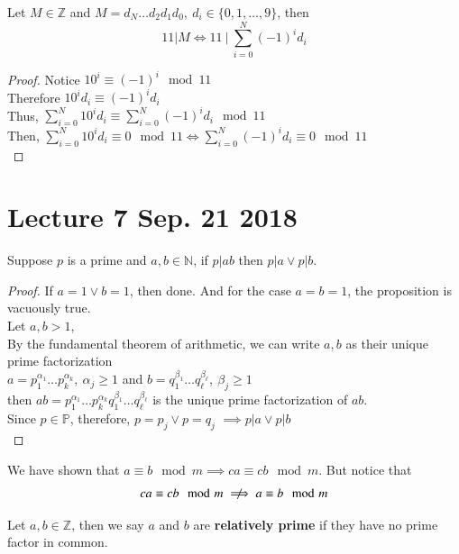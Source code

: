 \documentclass[10pt]{article}
\begin{document}
	\begin{theorem}
		Let $M \in \mathbb{Z}$ and $M = d_N \dots d_2 d_1 d_0,\ d_i \in \{0,1,\dots,9\}$, then 
		\[
			11 | M \iff 11\ |\ \sum_{i=0}^N{(-1)^i d_i}
		\]
	\end{theorem}
	
	\begin{proof}
		Notice $10^i \equiv (-1)^i \mod 11$ \\
		Therefore $10^i d_i \equiv (-1)^i d_i$ \\
		Thus, $\sum_{i=0}^N{10^i d_i} \equiv \sum_{i=0}^N{(-1)^i d_i} \mod 11$ \\
		Then, $\sum_{i=0}^N{10^i d_i} \equiv 0 \mod 11 \iff \sum_{i=0}^N{(-1)^i d_i} \equiv 0 \mod 11$ \\
	\end{proof}
	
	\section{Lecture 7 Sep. 21 2018}
	\begin{theorem}
		Suppose $p$ is a prime and $a,b \in \mathbb{N}$, if $p|ab$ then $p | a \lor p | b$.
	\end{theorem}
	\begin{proof}
		If $a = 1 \lor b = 1$, then done. And for the case $a = b = 1$, the proposition is vacuously true.\\
		Let $a, b > 1$, \\
		By the fundamental theorem of arithmetic, we can write $a, b $ as their unique prime factorization \\
		$a = p_1^{\alpha_1} \dots p_k^{\alpha_k},\ \alpha_j \geq 1$ and $b = q_1^{\beta_1}\dots q_\ell^{\beta_\ell},\ \beta_j \geq 1$\\
		then $ab = p_1^{\alpha_1} \dots p_k^{\alpha_k}q_1^{\beta_1}\dots q_\ell^{\beta_\ell}$ is the unique prime factorization of $ab$. \\
		Since $p \in \mathbb{P}$, therefore, $p=p_j \lor p = q_j$ 
		$\implies p | a \lor p | b$ \\
	\end{proof}
	
	\begin{remark}
		We have shown that $a \equiv b \mod m \implies ca \equiv cb \mod m$. But notice that 
		\[
			ca \equiv cb \mod m \centernot \implies a \equiv b \mod m
		\]
	\end{remark}
	
	\begin{definition}
		Let $a,b \in \mathbb{Z}$, then we say $a$ and $b$ are \textbf{relatively prime} if they have no prime factor in common.
	\end{definition}
	
\end{document}
